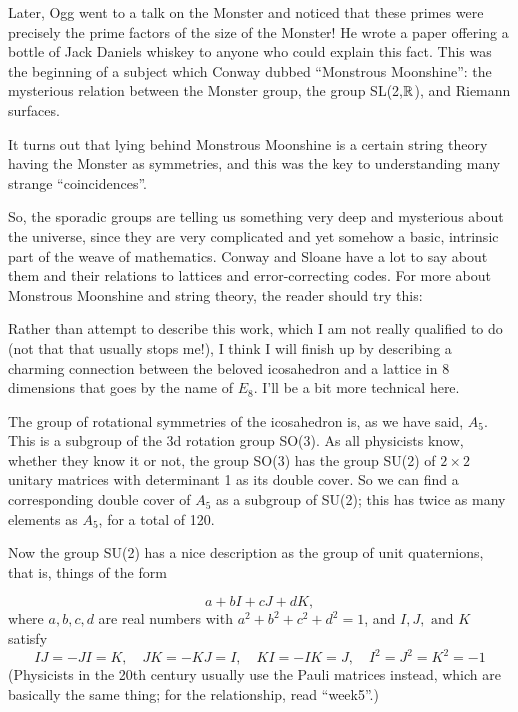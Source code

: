 Later, Ogg went to a talk on the Monster and noticed that these primes were precisely the prime factors of the size of the Monster! He wrote a paper offering a bottle of Jack Daniels whiskey to anyone who could explain this fact. This was the beginning of a subject which Conway dubbed ``Monstrous Moonshine'': the mysterious relation between the Monster group, the group SL(2,$\mathbb R$), and Riemann surfaces.

It turns out that lying behind Monstrous Moonshine is a certain string theory having the Monster as symmetries, and this was the key to understanding many strange ``coincidences''.

So, the sporadic groups are telling us something very deep and mysterious about the universe, since they are very complicated and yet somehow a basic, intrinsic part of the weave of mathematics. Conway and Sloane have a lot to say about them and their relations to lattices and error-correcting codes. For more about Monstrous Moonshine and string theory, the reader should try this:


Rather than attempt to describe this work, which I am not really qualified to do (not that that usually stops me!), I think I will finish up by describing a charming connection between the beloved icosahedron and a lattice in 8 dimensions that goes by the name of $E_8$. I'll be a bit more technical here.

The group of rotational symmetries of the icosahedron is, as we have said, $A_5$. This is a subgroup of the 3d rotation group SO(3). As all physicists know, whether they know it or not, the group SO(3) has the group SU(2) of $2 \times 2$ unitary matrices with determinant 1 as its double cover. So we can find a corresponding double cover of $A_5$ as a subgroup of SU(2); this has twice as many elements as $A_5$, for a total of 120.

Now the group SU(2) has a nice description as the group of unit quaternions, that is, things of the form

\[          a + bI + cJ + dK,\]
where $a,b,c,d$ are real numbers with $a^2 + b^2 + c^2 + d^2 = 1$, and $I,J,\text{ and }K$ satisfy
\[IJ = -JI = K, \quad	JK = -KJ = I, \quad   KI = -IK = J, \quad  I^2 = J^2 = K^2 = -1\]
(Physicists in the 20th century usually use the Pauli matrices instead, which are basically the same thing; for the relationship, read ``week5''.)

